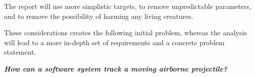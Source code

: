 The report will use more simplistic targets, to remove unpredictable parameters, and to remove the possibility of harming any living creatures.

These considerations creates the following initial problem, whereas the analysis will lead to a more in-depth set of requirements and a concrete problem statement.
\label{key:initialProblem}

\begin{center}
  \textit{\textbf{How can a software system track a moving airborne projectile?}}
\end{center}
